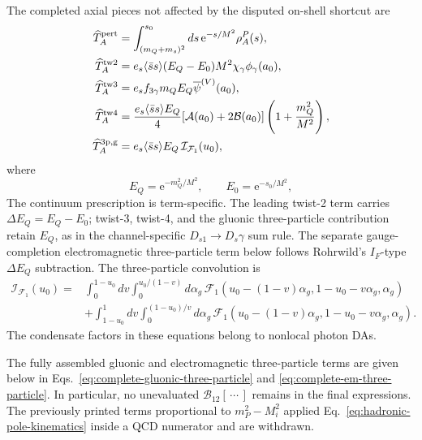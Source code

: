 \documentclass[11pt]{article}
\newcommand{\ee}{\mathrm{e}}
\begin{document}
The completed axial pieces not affected by the disputed on-shell shortcut are
\begin{align}
 \widehat T_A^{\rm pert}
 &=\int_{(m_Q+m_s)^2}^{s_0}ds\,
   \ee^{-s/M^2}\rho_A^P(s),
 \nonumber\\
 \widehat T_A^{\rm tw2}
 &=e_s\langle\bar ss\rangle(E_Q-E_0)M^2
   \chi_\gamma\phi_\gamma(a_0),
 \nonumber\\
 \widehat T_A^{\rm tw3}
 &=e_sf_{3\gamma}m_QE_Q\overline\psi^{(V)}(a_0),
 \nonumber\\
 \widehat T_A^{\rm tw4}
 &=\frac{e_s\langle\bar ss\rangle E_Q}{4}
   [\mathcal A(a_0)+2\mathcal B(a_0)]
   \left(1+\frac{m_Q^2}{M^2}\right),
 \nonumber\\
 \widehat T_A^{\rm 3p,g}
 &=e_s\langle\bar ss\rangle E_Q\,
   \mathcal I_{\mathcal F_1}(u_0),
 \label{eq:full-axial-borel-invariant}
\end{align}
where
\begin{equation}
 E_Q=\ee^{-m_Q^2/M^2},\qquad E_0=\ee^{-s_0/M^2},
 \label{eq:borel-exponent-shorthand}
\end{equation}
The continuum prescription is term-specific.  The leading twist-2 term
carries $\Delta E_Q=E_Q-E_0$; twist-3, twist-4, and the gluonic
three-particle contribution retain $E_Q$, as in the channel-specific
$D_{s1}\to D_s\gamma$ sum rule.  The separate gauge-completion
electromagnetic three-particle term below follows Rohrwild's $I_F$-type
$\Delta E_Q$ subtraction.  The three-particle convolution is
\begin{align}
 \mathcal I_{\mathcal F_1}(u_0)={}&
 \int_0^{1-u_0}dv
 \int_0^{u_0/(1-v)}d\alpha_g\,
 \mathcal F_1(u_0-(1-v)\alpha_g,
              1-u_0-v\alpha_g,\alpha_g)
 \nonumber\\
 &+\int_{1-u_0}^{1}dv
 \int_0^{(1-u_0)/v}d\alpha_g\,
 \mathcal F_1(u_0-(1-v)\alpha_g,
              1-u_0-v\alpha_g,\alpha_g).
 \label{eq:F1-integral-compact}
\end{align}
The condensate factors in these equations belong to nonlocal photon DAs.

The fully assembled gluonic and electromagnetic three-particle terms are
given below in Eqs.~\eqref{eq:complete-gluonic-three-particle} and
\eqref{eq:complete-em-three-particle}.  In particular, no unevaluated
$\mathcal B_{12}[\,\cdots\,]$ remains in the final expressions.  The
previously printed terms proportional to $m_P^2-M_i^2$ applied
Eq.~\eqref{eq:hadronic-pole-kinematics} inside a QCD numerator and are
withdrawn.
\end{document}
